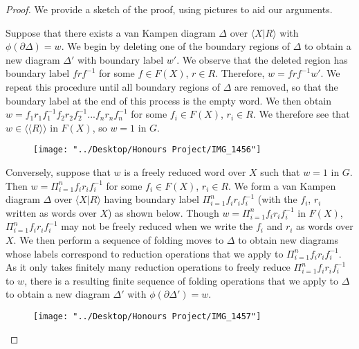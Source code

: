 \documentclass[12pt]{article}
\newcommand{\vs}{\vskip10pt}
\begin{document}
	\begin{proof}
		
		We provide a sketch of the proof, using pictures to aid our arguments. 
		
		\vs
		
		Suppose that there exists a van Kampen diagram $\Delta$ over $\langle X \vert R \rangle$ with $\phi(\partial \Delta) = w$. We begin by deleting one of the boundary regions of $\Delta$ to obtain a new diagram $\Delta'$ with boundary label $w'$. We observe that the deleted region has boundary label $frf^{-1}$ for some $f \in F(X)$, $r \in R$. Therefore, $w = frf^{-1} w'$. We repeat this procedure until all boundary regions of $\Delta$ are removed, so that the boundary label at the end of this process is the empty word. We then obtain $w = f_1 r_1 f_1^{-1} f_2 r_2 f_2^{-1}...f_n r_n f_n^{-1}$ for some $f_i \in F(X)$, $r_i \in R$. We therefore see that $w \in \langle \langle R \rangle \rangle$ in $F(X)$, so $w = 1$ in $G$. 
		
\begin{figure} [h]
	\centering
	\texttt{[image: "../Desktop/Honours Project/IMG\_1456"]}
	\caption{}
	\label{fig:img1456}
\end{figure}
		
		\vs 
		
		Conversely, suppose that $w$ is a freely reduced word over $X$ such that $w = 1$ in $G$. Then $w = \Pi_{i=1}^n f_i r_i f_i^{-1}$ for some $f_i \in F(X)$, $r_i \in R$. We form a van Kampen diagram $\Delta$ over $\langle X \vert R \rangle$ having boundary label $\Pi_{i=1}^n f_i r_i f_i^{-1}$ (with the $f_i$, $r_i$ written as words over $X$) as shown below. Though $w = \Pi_{i=1}^n f_i r_i f_i^{-1}$ in $F(X)$, $\Pi_{i=1}^n f_i r_i f_i^{-1}$ may not be freely reduced when we write the $f_i$ and $r_i$ as words over $X$. We then perform a sequence of folding moves to $\Delta$ to obtain new diagrams whose labels correspond to reduction operations that we apply to $\Pi_{i=1}^n f_i r_i f_i^{-1}$. As it only takes finitely many reduction operations to freely reduce $\Pi_{i=1}^n f_i r_i f_i^{-1}$ to $w$, there is a resulting finite sequence of folding operations that we apply to $\Delta$ to obtain a new diagram $\Delta'$ with $\phi(\partial \Delta') = w$. 
		
\begin{figure} [h]
	\centering
	\texttt{[image: "../Desktop/Honours Project/IMG\_1457"]}
	\caption{}
	\label{fig:img1457}
\end{figure}
		
	\end{proof}
	
\end{document}
